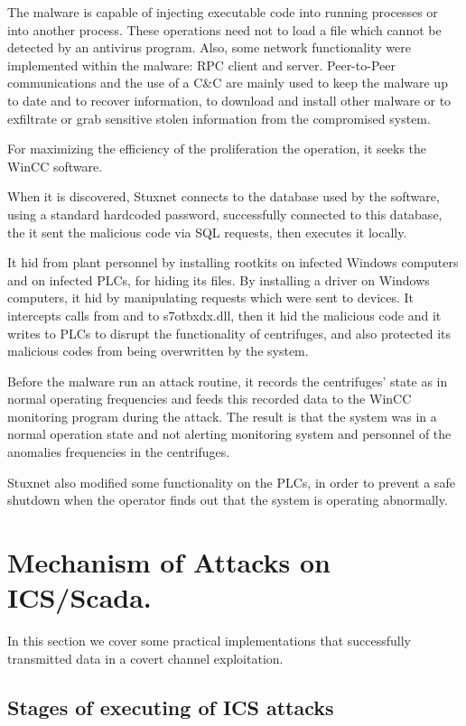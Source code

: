 \documentclass[conference]{IEEEtran}
\begin{document}
The malware is capable of injecting executable code into running processes or into another process. These operations need not to load a file which cannot be detected by an antivirus program. Also, some network functionality were implemented within the malware: RPC client and server. Peer-to-Peer communications and the use of a C&C are mainly used to keep the malware up to date and to recover information, to download and install other malware or to exfiltrate or grab sensitive stolen information from the compromised system.



For maximizing the efficiency of the proliferation the operation, it seeks the WinCC software.

When it is discovered, Stuxnet connects to the
 database used by the software, using a standard hardcoded password, successfully connected to this database, the it sent the malicious code via SQL requests, then executes it locally.

It hid from plant personnel by installing rootkits on infected Windows computers and on infected PLCs, for hiding its files. By installing a driver on Windows computers, it hid by manipulating requests which were sent to devices. It intercepts calls from and to s7otbxdx.dll, then it hid the malicious code and it writes to PLCs to disrupt the functionality of centrifuges, and also protected its malicious codes from being overwritten by the system.

Before the malware run an attack routine, it records the centrifuges’ state as in normal operating frequencies and feeds this recorded data to the WinCC monitoring program during the attack. The result is that the system was in a normal operation state and not alerting monitoring system and personnel of the anomalies frequencies in the centrifuges.

Stuxnet also modified some functionality on the PLCs, in order to prevent a safe shutdown when the operator finds out that the system is operating abnormally.

\section{ Mechanism of Attacks on ICS/Scada.}
\label{sec:APP}
	In this section we cover some practical implementations that successfully transmitted data in a covert channel exploitation.
\subsection{Stages of executing of ICS attacks}
\end{document}
